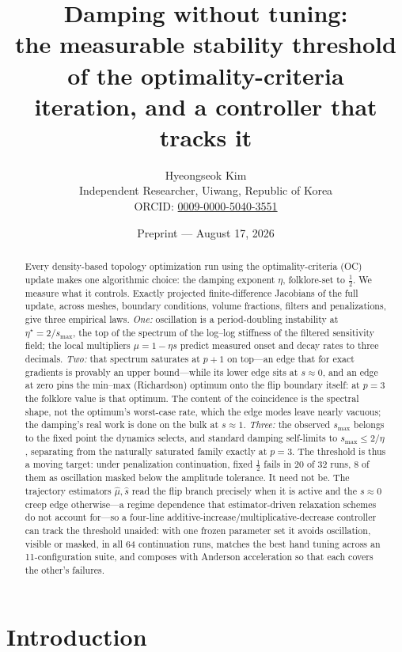\documentclass[11pt,a4paper]{article}
\title{Damping without tuning:\\
the measurable stability threshold of the optimality-criteria\\
iteration, and a controller that tracks it}
\author{Hyeongseok Kim\\[2pt]
{\normalsize Independent Researcher, Uiwang, Republic of Korea}\\[2pt]
{\small ORCID: \href{https://orcid.org/0009-0000-5040-3551}
{0009-0000-5040-3551}}}
\date{Preprint --- August 17, 2026}
\newcommand{\smax}{s_{\max}}
\newcommand{\etastar}{\eta^{\star}}
\newcommand{\muh}{\hat{\mu}}
\newcommand{\sh}{\hat{s}}
\begin{document}
\maketitle

\begin{abstract}
Every density-based topology optimization run using the
optimality-criteria (OC) update makes one algorithmic choice: the
damping exponent $\eta$, folklore-set to $\tfrac12$. We measure what it
controls. Exactly projected finite-difference Jacobians of the full
update, across meshes, boundary conditions, volume fractions, filters
and penalizations, give three empirical laws. \emph{One:} oscillation
is a period-doubling instability at $\etastar=2/\smax$, the top of the
spectrum of the log--log stiffness of the filtered sensitivity field;
the local multipliers $\mu=1-\eta s$ predict measured onset and decay
rates to three decimals. \emph{Two:} that spectrum saturates at
$p{+}1$ on top---an edge that for exact gradients is provably an upper
bound---while its lower edge sits at $s\approx0$, and an edge at
zero pins the min--max (Richardson) optimum onto the flip boundary
itself: at $p=3$ the folklore value is that optimum. The content of the
coincidence is the spectral shape, not the optimum's worst-case rate,
which the edge modes leave nearly vacuous; the damping's real work is
done on the bulk at $s\approx1$. \emph{Three:} the observed $\smax$
belongs to the fixed point the dynamics selects, and standard damping
self-limits to $\smax\le2/\eta$, separating from the naturally
saturated family exactly at $p=3$. The threshold is thus a moving
target: under penalization continuation, fixed $\tfrac12$ fails in 20
of 32 runs, 8 of them as oscillation masked below the amplitude
tolerance. It need not be. The trajectory estimators
$\muh,\sh$ read the flip branch precisely when it is active and the
$s\approx0$ creep edge otherwise---a regime dependence that
estimator-driven relaxation schemes do not account for---so a four-line
additive-increase/multiplicative-decrease controller can track the
threshold unaided: with one frozen parameter set it avoids
oscillation, visible or masked, in all 64 continuation runs, matches the best hand tuning across an
11-configuration suite, and composes with Anderson acceleration so that
each covers the other's failures.
\end{abstract}

\section{Introduction}\label{sec:intro}
\end{document}
